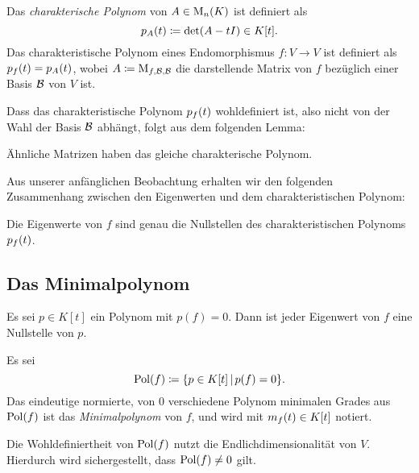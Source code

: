 \begin{definition}
  Das \emph{charakterische Polynom} von $A \in \operatorname{M}_{n}(K)$ ist definiert als
  \[
              p_{A}(t)
    \coloneqq \det ( A - t I )
    \in       K[t].
  \]
  Das charakteristische Polynom eines Endomorphismus $f \colon V \to V$ ist definiert als $p_{f}(t) = p_{A}(t)$, wobei $A \coloneqq \operatorname{M}_{f, \mathcal{B}, \mathcal{B}}$ die darstellende Matrix von $f$ bezüglich einer Basis $\mathcal{B}$ von $V$ ist.
\end{definition}

Dass das charakteristische Polynom $p_{f}(t)$ wohldefiniert ist, also nicht von der Wahl der Basis $\mathcal{B}$ abhängt, folgt aus dem folgenden Lemma:

\begin{lemma}
  Ähnliche Matrizen haben das gleiche charakterische Polynom.
\end{lemma}

Aus unserer anfänglichen Beobachtung erhalten wir den folgenden Zusammenhang zwischen den Eigenwerten und dem charakteristischen Polynom:

\begin{proposition}
  Die Eigenwerte von $f$ sind genau die Nullstellen des charakteristischen Polynoms $p_{f}(t)$.
\end{proposition}





\subsection{Das Minimalpolynom}

\begin{lemma}
  \label{lemma: polynomial equations give restriction for the eigenvalues}
  Es sei $p \in K[t]$ ein Polynom mit $p(f) = 0$.
  Dann ist jeder Eigenwert von $f$ eine Nullstelle von $p$.
\end{lemma}

\begin{definition}
  Es sei
  \[
              \operatorname{Pol}(f)
    \coloneqq \{ p \in K[t] \,|\, p(f) = 0 \}.
  \]
  Das eindeutige normierte, von $0$ verschiedene Polynom minimalen Grades aus $\operatorname{Pol}(f)$ ist das \emph{Minimalpolynom} von $f$, und wird mit $m_{f}(t) \in K[t]$ notiert.
\end{definition}

\begin{remark}
  Die Wohldefiniertheit von $\operatorname{Pol}(f)$ nutzt die Endlichdimensionalität von $V$.
  Hierdurch wird sichergestellt, dass $\operatorname{Pol}(f) \neq 0$ gilt.
\end{remark}

